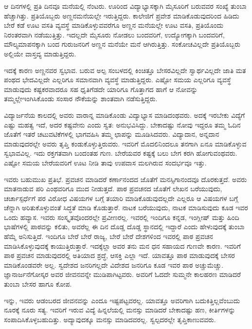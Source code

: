 {ಆ ದಿನಗಳಲ್ಲಿ ಪ್ರತಿ ದಿನವೂ ಮನೆಯಲ್ಲಿ ನೆಂಟರು. ಊರಿಂದ ವಿದ್ಯಾಭ್ಯಾಸ\-ಕ್ಕಾಗಿ ಮೈಸೂರಿಗೆ ಬರುವವರ ಸಂಖ್ಯೆ ತುಂಬಾ ಹೆಚ್ಚಾಗಿತ್ತು.  ಪ್ರತಿಯೊಬ್ಬರು ಅಣ್ಣನ\break ಮನೆಯಲ್ಲೇ ಇರುತ್ತಿದ್ದರು.  ಕಾಲೇಜಿಗೆ ಪ್ರವೇಶ ಮಾಡಿಕೊಡುವುದರಿಂದ ಹಿಡಿದು ಬೇರೆ ಕಡೆ ಊಟ   \enginline{-}   ವಸತಿ ವ್ಯವಸ್ಥೆ ಮಾಡಿಕೊಳ್ಳುವವರೆಗೂ ಅಣ್ಣನ ಮನೆಯಲ್ಲೇ ಊಟ   \enginline{-}   ವಸತಿ, ಪ್ರತಿಯೊಂದು ನಿರಂತರವಾಗಿ ನಡೆಯುತ್ತಿತ್ತು.  ಇದಲ್ಲದೇ ಮೈಸೂರು ನೋಡಲು ಬಂದವರಿಗೆ, ಉದ್ಯೋಗಕ್ಕಾಗಿ ಬಂದವರಿಗೆ, ಮೌಲ್ಯಮಾಪನಕ್ಕಾಗಿ ಬಂದ ಗುರುಜನರಿಗೆ ಅಣ್ಣನ ಮನೆಯೇ  ಮನೆ ಆಗಿರುತ್ತಿತ್ತು.  ಸಂಕೋಚವಿಲ್ಲದೇ  ಪ್ರತಿಯೊಬ್ಬರು ಅಲ್ಲಿಯೇ ವಾಸ್ತವ್ಯ ಮಾಡುತ್ತಿದ್ದರು.  

ಇದಕ್ಕೆ ಕಾರಣ ಅಣ್ಣನವರ ಸ್ವಭಾವ. ಬರುವ ಅಲ್ಪ ಸಂಬಳದಲ್ಲಿ ಕಿಂಚಿತ್ತೂ ಬೇಸರ\-ವಿಲ್ಲದೇ ಸ್ವಾರ್ಥವಿಲ್ಲದೇ ಜಾತಿ ಮತ ಪಂಥದ ಭೇದವಿಲ್ಲದೇ ಎಲ್ಲರಿಗೂ ಸಮಾನವಾಗಿ ವ್ಯವಸ್ಥೆ ಮಾಡುತ್ತಿದ್ದರು.  ಎಷ್ಟೋ ಸಮಯ ಎಲ್ಲರಿಗೂ ವ್ಯವಸ್ಥೆ ಮಾಡುವುದು ಕಷ್ಟಕರ\-ವಾದರೂ ಸಹ ಧೃತಿಗೆಡದೇ ಯಾರಿಗೂ ಗೊತ್ತಾಗದ ಹಾಗೆ ಆ ನೋವನ್ನು ತಮ್ಮಲ್ಲೇ\break ಇಂಗಿಸಿಕೊಂಡು ಸಂಸಾರ ನೌಕೆಯನ್ನು ಶಾಂತವಾಗಿ ನಡೆಸುತ್ತಿದ್ದರು.

ವಿದ್ಯಾರ್ಜನೆಯ ಕಾಲದಲ್ಲಿ ಅವರು ವಾರಾನ್ನ ಮಾಡಿಕೊಂಡು ವಿದ್ಯಾಭ್ಯಾಸ ಮಾಡಿದಂಥವರು.  ಅದಕ್ಕೆ ಇರಬೇಕು ವಿದ್ಯೆಗೆ ಎಷ್ಟು ಮಹತ್ವ ಇದೆ, ಅದರ ಕಷ್ಟವೇನು ಎಂದು ಸ್ವತ: ಅನುಭವಿಸಿದ್ದು.  ಬೇಕಾದಷ್ಟು ನೋವು ಇದ್ದರೂ ತಮ್ಮ ಓದಿನ ಜೊತೆಗೆ ಇತರೆ ಚಟುವಟಿಕೆಗಳಲ್ಲಿ ಭಾಗವಹಿಸಿ ತಮ್ಮ ಛಾಪನ್ನು ಮೂಡಿಸಿದವರು.  ವಿದ್ಯಾದಾನ, ಅನ್ನದಾನ ಮಾಡುವುದರಲ್ಲೇ ಅವರು ತೃಪ್ತಿ ಕಂಡುಕೊಳ್ಳುತ್ತಿರುವರು.  ಇವರಿಗೆ ಮೊದಲಿನಿಂದಲೂ ತನಗಾಗಿ ಏನೂ ಮಾಡಿಕೊಳ್ಳುವ ಸ್ವಭಾವವಿಲ್ಲ. ಇದು ರಕ್ತಗತವಾಗಿ ಬಂದಂತಹ ಗುಣ. ಬೇರೆಯವರ ಕಷ್ಟಕ್ಕೆ ಬಲು ಬೇಗ ಕರಗಿ ಹೋಗುವಂಥವರು. ಎಷ್ಟೋ ಸಮಯ ಬೇರೆಯವರಿಗೆ ಊಟ ನೀಡಿ ತಾವು ಉಪವಾಸ ಮಲಗಿರುವ ಸಂದರ್ಭವೂ ಇತ್ತು.  

ಇವರು ಬಹುಮುಖ ಪ್ರತಿಭೆ.   ಪ್ರವಚನ ಮಾಡಿದರೆ ಕರ್ಣಾನಂದದ ಜೊತೆಗೆ ಮನಸ್ಸಿ\-ಗಾನಂದವೂ ದೊರಕುತ್ತದೆ.  ಅವರು ಮಾತನಾಡುವ ಪರಿ ಎಂಥವರಿಗೂ ಮುದ ನೀಡುತ್ತದೆ.  ಪಾಠ   \enginline{-}   ಪ್ರವಚನದ ಜೊತೆಗೆ ಲೇಖನ ಬರೆಯುವುದು, ಚರ್ಚಾಸ್ಪರ್ಧೆಗೆ ಪರ ವಿರೋಧ ವಿಷಯಗಳ ಬಗ್ಗೆ ತಯಾರಿ ಮಾಡಿಕೊಡುವುದಲ್ಲದೇ ಎಲ್ಲರೂ ಆ ವಿಷಯಗಳ ಬಗ್ಗೆ ಚೆನ್ನಾಗಿ ಅರಿತುಕೊಳ್ಳುವಂತೆ ಸಿದ್ಧತೆ ಮಾಡಿ ಕೊಡುತ್ತಾರೆ. ನಾಟಕ ಬರೆಯುವುದು, ನಾಟಕ ಮಾಡಿಸುವುದು ಕೂಡ ಇವರ ಒಂದು ಹವ್ಯಾಸ. ಇವರು ಸಂಸ್ಕೃತವೊಂದರಲ್ಲೇ ಪ್ರವೀಣರಲ್ಲ. ಇವರಲ್ಲಿ ಇಂದಿಗೂ ಕನ್ನಡ, ಇಂಗ್ಲೀಷ್ ಮತ್ತು ಹಿಂದಿ ಭಾಷೆಗಳಲ್ಲಿ ಪಾಠವನ್ನು ಕಲಿತು, ಅವರೆಲ್ಲ ಈ ದಿನ ದೊಡ್ಡ ದೊಡ್ಡ ಸ್ಥಾನದಲ್ಲಿ ಇದ್ದಾರೆ ಎಂದು ಹೇಳುವುದಕ್ಕೆ ತುಂಬಾ ಹೆಮ್ಮೆ ಅನಿಸುತ್ತಿದೆ. ಇಂದಿಗೂ ಬೇರೆ ಬೇರೆ ರಾಜ್ಯ, ಬೇರೆ ಬೇರೆ ದೇಶಗಳಿಂದ ಇವರಲ್ಲಿ ಪಾಠ ಪ್ರವಚನ ಮಾಡಿಸಿಕೊಳ್ಳುವುದಕ್ಕೆ  ಕಾಯುತ್ತಿರುತ್ತಾರೆ.  ಇದಕ್ಕೆಲ್ಲಾ ಅವರ ತನು  \enginline{-}  ಮನ  \enginline{-}  ಧನ ಸಹಾಯದ ಗುಣವೇ ಕಾರಣ.  ಇವರಿಗೆ ಪಾಠ ಪ್ರವಚನ ಮಾಡುವುದರಲ್ಲಿ ಅತಿಯಾದ ಶ್ರದ್ಧೆ, ಆಸಕ್ತಿ ಎಲ್ಲಾ ಇದೆ.  ಯಾವತ್ತೂ ಪಾಠ ಮಾಡುವುದಕ್ಕೆ ಬೇಸರ ಮಾಡಿಕೊಂಡವರೇ ಅಲ್ಲ. ಸ್ವದೇಶದ ಜನರಿಗಲ್ಲದೇ ವಿದೇಶದ ಜನರಿಗೂ ಕೂಡ ಇವರ ಪಾಠ ಅಚ್ಚುಮೆಚ್ಚು. ಜ್ಞಾನಾರ್ಜನೆಗೋಸ್ಕರ  ಅವರ  ಜೀವನವನ್ನೇ ಮುಡಿಪಾಗಿಟ್ಟವರು.  ಅವರಿಗೆ ಓದದೇ ಸುಮ್ಮನೇ ಕಾಲಹರಣ ಮಾಡಿದರೆ ತುಂಬಾ ಬೇಸರ ಹಾಗೂ ಕೋಪ. 

ಇನ್ನು, ಇವರು ಆಡಂಬರದ ಜೀವನವನ್ನು ಎಂದೂ ಇಷ್ಟಪಟ್ಟವರಲ್ಲ. ಯಾವತ್ತೂ ಅವರಿಗಾಗಿ ಬದುಕಿತ್ತಿಲ್ಲವೆಂಬುದು ನೂರಕ್ಕೆ ನೂರು ಸತ್ಯ. ಇವರಿಗೆ ಇರುವ ವಿದ್ಯೆ ಹಿನ್ನಲೆಯಲ್ಲಿ ಮನಸ್ಸು ಮಾಡಿದರೆ ಬೇಕಾದಷ್ಟು ಹಣ, ಕೀರ್ತಿಗಳನ್ನು ಸಂಪಾದಿಸಿಕೊಳ್ಳಬಹುದಿತ್ತು.  ಅದ್ಯಾವುದಕ್ಕೂ ಮನಸ್ಸು ಮಾಡಿದವರಲ್ಲ.  ಸ್ವಲ್ಪದರಲ್ಲೇ ತೃಪ್ತಿಕಾಣುವವರು. 

}
